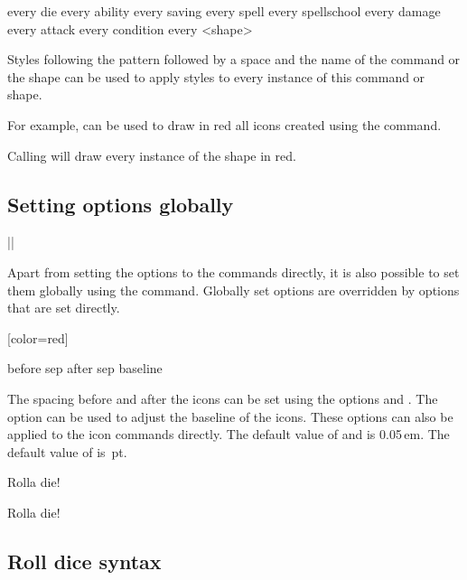 \documentclass[a4paper]{article}
\begin{document}
\begin{macrodef}
every die
every ability
every saving
every spell
every spellschool
every damage
every attack
every condition
every <shape>
\end{macrodef}
Styles following the pattern  followed by a space and the name of the command or the shape can be used to apply styles to every instance of this command or shape.

For example,  can be used to draw in red all icons created using the \macro{\die} command.

Calling  will draw every instance of the  shape in red.

\subsection{Setting options globally}

\begin{macrodef}
|\rpgiconsset|
\end{macrodef}
Apart from setting the options to the commands directly, it is also possible to set them globally using the \macro{\rpgiconsset} command. Globally set options are overridden by options that are set directly.

\begin{codeexample}

[color=red]
\end{codeexample}

\begin{macrodef}
before sep
after sep
baseline
\end{macrodef}
The spacing before and after the icons can be set using the options  and . The option  can be used to adjust the baseline of the icons. These options can also be applied to the icon commands directly. The default value of  and  is 0.05\,em. The default value of  is \,pt.

\begin{codeexample}
Rolla die!

Rolla die!
\end{codeexample}

\subsection{Roll dice syntax}\label{sec:roll-dice-syntax}
\end{document}
